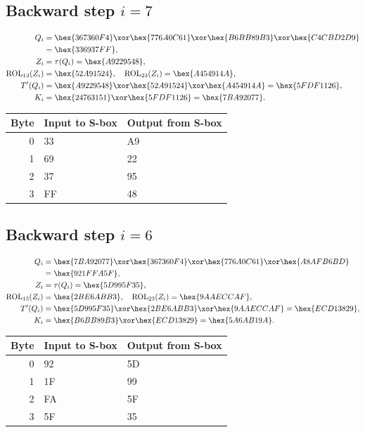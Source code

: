 \subsection*{Backward step $i=7$}
\begin{align*}
Q_i&=\hex{367360F4}\xor\hex{776A0C61}\xor\hex{B6BB89B3}\xor\hex{C4CBD2D9}\\&=\hex{336937FF},\\
Z_i&=\tau(Q_i)=\hex{A9229548},\\
\operatorname{ROL}_{13}(Z_i)&=\hex{52A91524},\quad\operatorname{ROL}_{23}(Z_i)=\hex{A454914A},\\
T'(Q_i)&=\hex{A9229548}\xor\hex{52A91524}\xor\hex{A454914A}=\hex{5FDF1126},\\
K_i&=\hex{24763151}\xor\hex{5FDF1126}=\hex{7BA92077}.\end{align*}
\begingroup\small
\begin{longtable}{rll}
\toprule
Byte & Input to S-box & Output from S-box\\\midrule
\endhead
0 & 33 & A9\\
1 & 69 & 22\\
2 & 37 & 95\\
3 & FF & 48\\
\bottomrule\end{longtable}
\endgroup
\subsection*{Backward step $i=6$}
\begin{align*}
Q_i&=\hex{7BA92077}\xor\hex{367360F4}\xor\hex{776A0C61}\xor\hex{A8AFB6BD}\\&=\hex{921FFA5F},\\
Z_i&=\tau(Q_i)=\hex{5D995F35},\\
\operatorname{ROL}_{13}(Z_i)&=\hex{2BE6ABB3},\quad\operatorname{ROL}_{23}(Z_i)=\hex{9AAECCAF},\\
T'(Q_i)&=\hex{5D995F35}\xor\hex{2BE6ABB3}\xor\hex{9AAECCAF}=\hex{ECD13829},\\
K_i&=\hex{B6BB89B3}\xor\hex{ECD13829}=\hex{5A6AB19A}.\end{align*}
\begingroup\small
\begin{longtable}{rll}
\toprule
Byte & Input to S-box & Output from S-box\\\midrule
\endhead
0 & 92 & 5D\\
1 & 1F & 99\\
2 & FA & 5F\\
3 & 5F & 35\\
\bottomrule\end{longtable}
\endgroup
